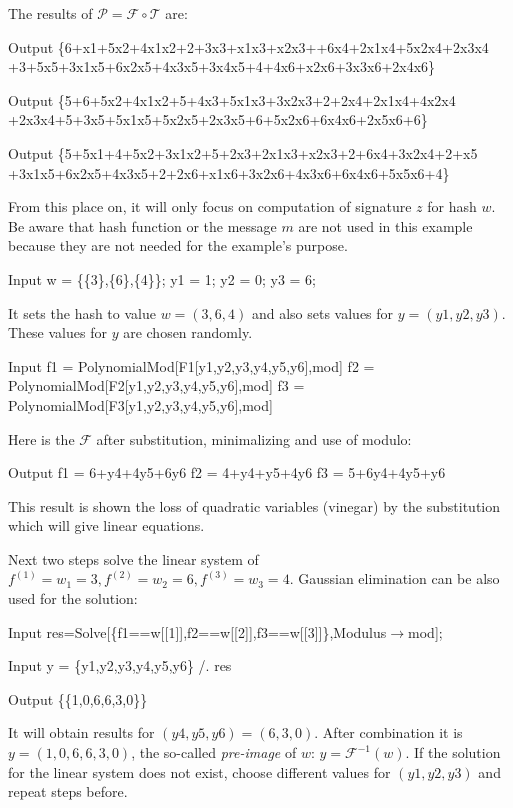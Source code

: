 \documentclass[thesis=M,english]{FITthesis}[2019/12/23]
\begin{document}
\noindent
The results of $\mathcal{P} = \mathcal{F} \circ \mathcal{T}$ are:
\begin{mmaCell}[addtoindex=3,leftmargin=1em]{Output}
\{6+x1+5x2+4x1x2+2+3x3+x1x3+x2x3++6x4+2x1x4+5x2x4+2x3x4
+3+5x5+3x1x5+6x2x5+4x3x5+3x4x5+4+4x6+x2x6+3x3x6+2x4x6\}
\end{mmaCell}
\begin{mmaCell}[leftmargin=1em]{Output}
\{5+6+5x2+4x1x2+5+4x3+5x1x3+3x2x3+2+2x4+2x1x4+4x2x4
+2x3x4+5+3x5+5x1x5+5x2x5+2x3x5+6+5x2x6+6x4x6+2x5x6+6\}
\end{mmaCell}
\begin{mmaCell}[leftmargin=1em]{Output}
\{5+5x1+4+5x2+3x1x2+5+2x3+2x1x3+x2x3+2+6x4+3x2x4+2+x5
+3x1x5+6x2x5+4x3x5+2+2x6+x1x6+3x2x6+4x3x6+6x4x6+5x5x6+4\}
\end{mmaCell}
From this place on, it will only focus on computation of signature $z$ for hash $w$. Be aware that hash function or the message $m$ are not used in this example because they are not needed for the example's purpose.
\begin{mmaCell}[moredefined={w, y1, y2, y3}]{Input}
w = \{\{3\},\{6\},\{4\}\};
y1 = 1;
y2 = 0;
y3 = 6;
\end{mmaCell}
It sets the hash to value $w = (3,6,4)$ and also sets values for $y = (y1,y2,y3)$. These values for $y$ are chosen randomly.
\begin{mmaCell}[addtoindex=3,moredefined={f1, F1, y1, y2, y3, mod, f2, F2, f3, F3}]{Input}
f1 = PolynomialMod[F1[y1,y2,y3,y4,y5,y6],mod]
f2 = PolynomialMod[F2[y1,y2,y3,y4,y5,y6],mod]
f3 = PolynomialMod[F3[y1,y2,y3,y4,y5,y6],mod]
\end{mmaCell}
Here is the $\mathcal{F}$ after substitution, minimalizing and use of modulo:
\begin{mmaCell}{Output}
f1 = 6+y4+4y5+6y6
f2 = 4+y4+y5+4y6
f3 = 5+6y4+4y5+y6
\end{mmaCell}
This result is shown the loss of quadratic variables (vinegar) by the substitution which will give linear equations.

\bigskip
\noindent
Next two steps solve the linear system of $f^{(1)} = w_1 = 3, f^{(2)} = w_2 = 6, f^{(3)} = w_3 = 4$. Gaussian elimination can be also used for the solution:
\begin{mmaCell}[moredefined={res, f1, w, f2, f3, mod}]{Input}
res=Solve[\{f1==w[[1]],f2==w[[2]],f3==w[[3]]\},Modulus\(\pmb{\to}\)mod];
\end{mmaCell}
\begin{mmaCell}[moredefined={y, y1, y2, y3, res}]{Input}
y = \{y1,y2,y3,y4,y5,y6\} /. res
\end{mmaCell}
\begin{mmaCell}{Output}
\{\{1,0,6,6,3,0\}\}
\end{mmaCell}
It will obtain results for $(y4,y5,y6) = (6,3,0)$. After combination it is $y = (1,0,6,6,3,0)$, the so-called \textit{pre-image} of $w$: $y = \mathcal{F}^{-1}(w)$. If the solution for the linear system does not exist, choose different values for $(y1,y2,y3)$ and repeat steps before.
\end{document}
